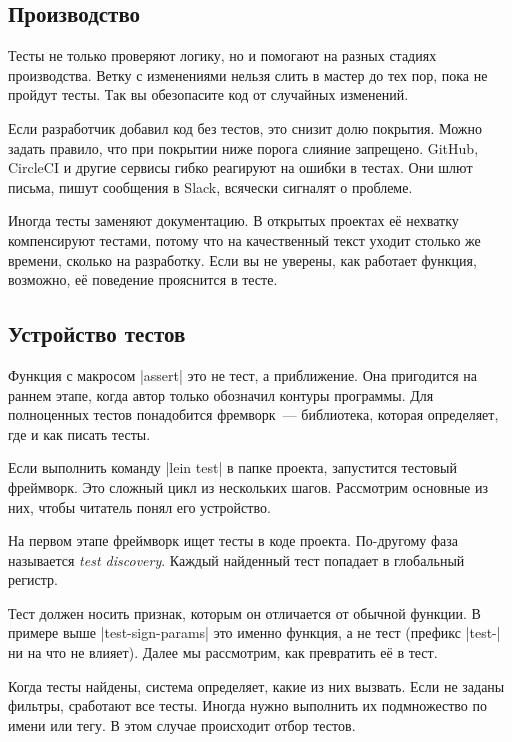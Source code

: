 \subsection{Производство}


Тесты не только проверяют логику, но и помогают на разных стадиях
производства. Ветку с изменениями нельзя слить в мастер до тех пор, пока не
пройдут тесты. Так вы обезопасите код от случайных изменений.

Если разработчик добавил код без тестов, это снизит долю покрытия. Можно задать
правило, что при покрытии ниже порога слияние запрещено. GitHub, CircleCI и
другие сервисы гибко реагируют на ошибки в тестах. Они шлют письма, пишут
сообщения в Slack, всячески сигналят о проблеме.

Иногда тесты заменяют документацию. В открытых проектах е\"{е} нехватку
компенсируют тестами, потому что на качественный текст уходит столько же
времени, сколько на разработку. Если вы не уверены, как работает функция,
возможно, е\"{е} поведение прояснится в тесте.

\subsection{Устройство тестов}


Функция с макросом \spverb|assert| это не тест, а приближение. Она пригодится на
раннем этапе, когда автор только обозначил контуры программы. Для полноценных
тестов понадобится фремворк~--- библиотека, которая определяет, где и как писать
тесты.

Если выполнить команду \spverb|lein test| в папке проекта, запустится тестовый
фреймворк. Это сложный цикл из нескольких шагов. Рассмотрим основные из них,
чтобы читатель понял его устройство.

На первом этапе фреймворк ищет тесты в коде проекта. По-другому фаза называется
\emph{test discovery}. Каждый найденный тест попадает в глобальный регистр.

Тест должен носить признак, которым он отличается от обычной функции. В примере
выше \spverb|test-sign-params| это именно функция, а не тест (префикс
\spverb|test-| ни на что не влияет). Далее мы рассмотрим, как превратить е\"{е} в
тест.

Когда тесты найдены, система определяет, какие из них вызвать. Если не заданы
фильтры, сработают все тесты. Иногда нужно выполнить их подмножество по имени
или тегу. В этом случае происходит отбор тестов.

